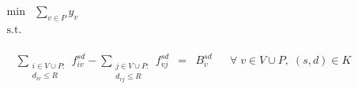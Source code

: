\begin{figure}
	
		\begin{equation*} \label{eq:fo}
		\begin{array}{rrclcl}
		\displaystyle \min & \displaystyle \sum_{v \in P} y_{v} \phantom{XXXXXXXXXXXXXXXXXXXXXXXXXXXXXXXXX}\\
		\textrm{s.t.}\\
		\end{array}
		\end{equation*}
		
		\begin{equation} \label{eq:balance}
		\begin{array}{rrclcl}
		&\displaystyle \sum_{\substack{i \in V \cup P:\\ d_{iv} \le R}} f^{sd}_{iv} - \displaystyle \sum_{\substack{j \in V \cup P:\\ d_{vj} \le R}} f^{sd}_{vj} & = & B^{sd}_{v} && \forall \; v \in V \cup P, \; (s,d) \in K \\
		\end{array}
		\end{equation}
		
		
		

\end{figure}
